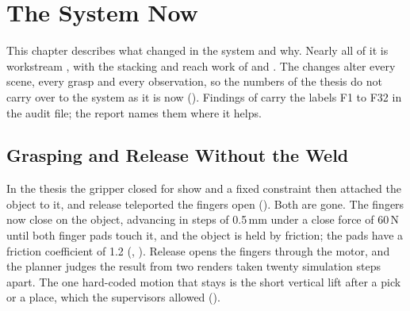 
\chapter{The System Now}
\label{ch:system}

This chapter describes what changed in the system and why. Nearly all of it is
workstream , with the stacking and reach work of  and . The
changes alter every scene, every grasp and every observation, so the numbers of
the thesis do not carry over to the system as it is now
(). Findings of  carry the labels F1 to F32 in the
audit file; the report names them where it helps.

\section{Grasping and Release Without the Weld}
\label{sec:grasp}

In the thesis the gripper closed for show and a fixed constraint then attached
the object to it, and release teleported the fingers open (). Both are
gone. The fingers now close on the object, advancing in steps of
0.5\,mm under a close force of 60\,N until both finger pads touch it, and the
object is held by friction; the pads have a friction coefficient of 1.2
(, ). Release opens the fingers through the motor, and the planner
judges the result from two renders taken twenty simulation steps apart. The one
hard-coded motion that stays is the short vertical lift after a pick or a place,
which the supervisors allowed ().

